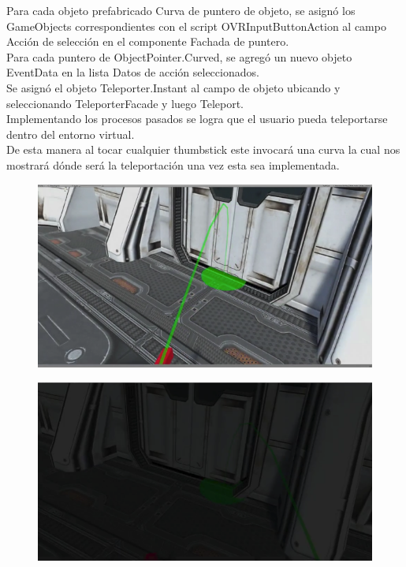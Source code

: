 Para cada objeto prefabricado Curva de puntero de objeto, se asignó los GameObjects correspondientes con el script OVRInputButtonAction al campo Acción de selección en el 
componente Fachada de puntero.\\
Para cada puntero de ObjectPointer.Curved, se agregó un nuevo objeto EventData en la lista Datos de acción seleccionados.\\
Se asignó el objeto Teleporter.Instant al campo de objeto ubicando y seleccionando TeleporterFacade y luego Teleport.\\
Implementando los procesos pasados se logra que el usuario pueda teleportarse dentro del  entorno virtual.\\
De esta manera al tocar cualquier thumbstick este invocará una curva la cual nos mostrará dónde será la teleportación una vez esta sea implementada.\\
\begin{figure}[H]
	\begin{center}
 		\includegraphics[width = .5\textwidth]{source/images/image35.png}
	\end{center} 
\end{figure}
\begin{figure}[H]
	\begin{center}
 		\includegraphics[width = .5\textwidth]{source/images/image61.png}
	\end{center} 
\end{figure}


